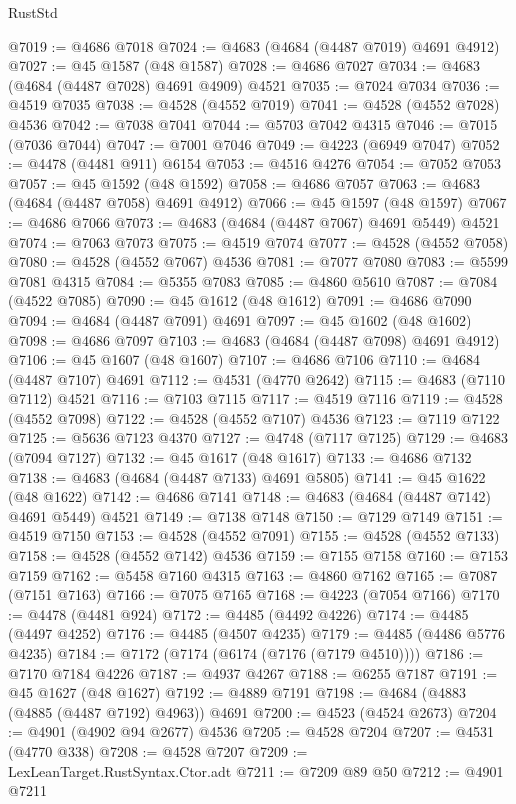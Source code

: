 \begin{lexlean}{RustStd}
\begin{coremodule}
@7019 := @4686 @7018
@7024 := @4683 (@4684 (@4487 @7019) @4691 @4912)
@7027 := @45 @1587 (@48 @1587)
@7028 := @4686 @7027
@7034 := @4683 (@4684 (@4487 @7028) @4691 @4909) @4521
@7035 := @7024 @7034
@7036 := @4519 @7035
@7038 := @4528 (@4552 @7019)
@7041 := @4528 (@4552 @7028) @4536
@7042 := @7038 @7041
@7044 := @5703 @7042 @4315
@7046 := @7015 (@7036 @7044)
@7047 := @7001 @7046
@7049 := @4223 (@6949 @7047)
@7052 := @4478 (@4481 @911) @6154
@7053 := @4516 @4276
@7054 := @7052 @7053
@7057 := @45 @1592 (@48 @1592)
@7058 := @4686 @7057
@7063 := @4683 (@4684 (@4487 @7058) @4691 @4912)
@7066 := @45 @1597 (@48 @1597)
@7067 := @4686 @7066
@7073 := @4683 (@4684 (@4487 @7067) @4691 @5449) @4521
@7074 := @7063 @7073
@7075 := @4519 @7074
@7077 := @4528 (@4552 @7058)
@7080 := @4528 (@4552 @7067) @4536
@7081 := @7077 @7080
@7083 := @5599 @7081 @4315
@7084 := @5355 @7083
@7085 := @4860 @5610
@7087 := @7084 (@4522 @7085)
@7090 := @45 @1612 (@48 @1612)
@7091 := @4686 @7090
@7094 := @4684 (@4487 @7091) @4691
@7097 := @45 @1602 (@48 @1602)
@7098 := @4686 @7097
@7103 := @4683 (@4684 (@4487 @7098) @4691 @4912)
@7106 := @45 @1607 (@48 @1607)
@7107 := @4686 @7106
@7110 := @4684 (@4487 @7107) @4691
@7112 := @4531 (@4770 @2642)
@7115 := @4683 (@7110 @7112) @4521
@7116 := @7103 @7115
@7117 := @4519 @7116
@7119 := @4528 (@4552 @7098)
@7122 := @4528 (@4552 @7107) @4536
@7123 := @7119 @7122
@7125 := @5636 @7123 @4370
@7127 := @4748 (@7117 @7125)
@7129 := @4683 (@7094 @7127)
@7132 := @45 @1617 (@48 @1617)
@7133 := @4686 @7132
@7138 := @4683 (@4684 (@4487 @7133) @4691 @5805)
@7141 := @45 @1622 (@48 @1622)
@7142 := @4686 @7141
@7148 := @4683 (@4684 (@4487 @7142) @4691 @5449) @4521
@7149 := @7138 @7148
@7150 := @7129 @7149
@7151 := @4519 @7150
@7153 := @4528 (@4552 @7091)
@7155 := @4528 (@4552 @7133)
@7158 := @4528 (@4552 @7142) @4536
@7159 := @7155 @7158
@7160 := @7153 @7159
@7162 := @5458 @7160 @4315
@7163 := @4860 @7162
@7165 := @7087 (@7151 @7163)
@7166 := @7075 @7165
@7168 := @4223 (@7054 @7166)
@7170 := @4478 (@4481 @924)
@7172 := @4485 (@4492 @4226)
@7174 := @4485 (@4497 @4252)
@7176 := @4485 (@4507 @4235)
@7179 := @4485 (@4486 @5776 @4235)
@7184 := @7172 (@7174 (@6174 (@7176 (@7179 @4510))))
@7186 := @7170 @7184 @4226
@7187 := @4937 @4267
@7188 := @6255 @7187
@7191 := @45 @1627 (@48 @1627)
@7192 := @4889 @7191
@7198 := @4684 (@4883 (@4885 (@4487 @7192) @4963)) @4691
@7200 := @4523 (@4524 @2673)
@7204 := @4901 (@4902 @94 @2677) @4536
@7205 := @4528 @7204
@7207 := @4531 (@4770 @338)
@7208 := @4528 @7207
@7209 := LexLeanTarget.RustSyntax.Ctor.adt
@7211 := @7209 @89 @50
@7212 := @4901 @7211

\end{coremodule}
\end{lexlean}
